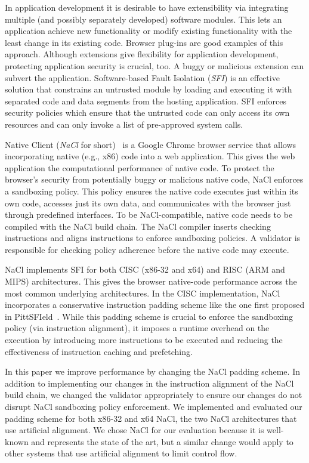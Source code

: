 \documentclass[conference]{IEEEtran}
\begin{document}
In application development it is desirable to have extensibility via integrating multiple (and possibly separately developed) software modules. 
This lets an application achieve new functionality or modify existing functionality with the least change in its existing code. 
Browser plug-ins are good examples of this approach. Although  extensions give flexibility for application development, protecting 
application security is crucial, too. A buggy or malicious extension can subvert the application. Software-based Fault Isolation (\textit{SFI}) is an 
effective solution that constrains an untrusted module by loading and executing it with  separated code and data segments from the hosting application. 
SFI enforces security policies which ensure that the untrusted code can only  access its own resources and can only  invoke a list of pre-approved system calls.


Native Client (\textit{NaCl} for short)~\cite{yeeNaCl} is a Google Chrome browser service that allows incorporating native (e.g., x86) code into a web application. 
This gives the web application the computational performance of native code. To protect the browser's security from  potentially buggy or malicious native code, 
NaCl enforces a sandboxing policy. This policy ensures the native code  executes just within its own code, accesses just its own data, and communicates with 
the browser just through predefined interfaces.  To be NaCl-compatible, native code  needs to be compiled with the NaCl build chain. The NaCl compiler inserts 
checking instructions and aligns instructions to enforce sandboxing policies. A validator is responsible for checking policy adherence before the 
native code may execute.

NaCl implements SFI for both CISC  (x86-32 and x64) and RISC (ARM and MIPS) architectures. This gives the browser native-code performance across 
the most common underlying architectures. In the CISC implementation, NaCl incorporates a conservative instruction padding scheme like the one first 
proposed in PittSFIeld~\cite{mccamantPittS}. While this padding scheme is crucial to enforce the sandboxing policy (via instruction alignment), it imposes a 
runtime overhead on the execution by introducing more instructions to be executed and reducing the effectiveness of instruction caching and prefetching.

In this paper we improve performance by changing the NaCl padding scheme. In addition to implementing our changes in the instruction alignment of the 
NaCl build chain, we changed the validator appropriately to ensure our changes do not disrupt NaCl sandboxing policy enforcement.
We implemented and evaluated our padding scheme for both x86-32 and
x64 NaCl, the two NaCl architectures that use artificial alignment.
We chose NaCl for our evaluation because it is well-known and
represents the state of the art, but a similar change would apply to
other systems that use artificial alignment to limit control flow.
\end{document}
